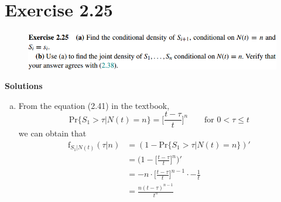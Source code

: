 \documentclass[UTF8]{article}
\begin{document}
\section{Exercise 2.25}
\begin{figure}[h]
    \centering
    \includegraphics[width=5.5in]{exercise_2_25.png}
\end{figure}
\textbf{Solutions}
\begin{enumerate}[a)]
    \item From the equation (2.41) in the textbook,
        \begin{equation*}
            \text{Pr}\{S_1>\tau|N(t)=n\}=\bigg[\frac{t-\tau}{t}\bigg]^n\qquad\text{for $0<\tau\leq t$}
        \end{equation*}
        we can obtain that
        \begin{equation*}
            \begin{aligned}
                \text{f}_{S_1|N(t)}(\tau|n)
                &=(1-\text{Pr}\{S_1>\tau|N(t)=n\})'\\
                &=\bigg(1-\bigg[\frac{t-\tau}{t}\bigg]^n\bigg)'\\
                &=-n\cdot\bigg[\frac{t-\tau}{t}\bigg]^{n-1}\cdot-\frac{1}{t}\\
                &=\frac{n(t-\tau)^{n-1}}{t^n}
            \end{aligned}           
        \end{equation*}


\end{enumerate}
\end{document}

